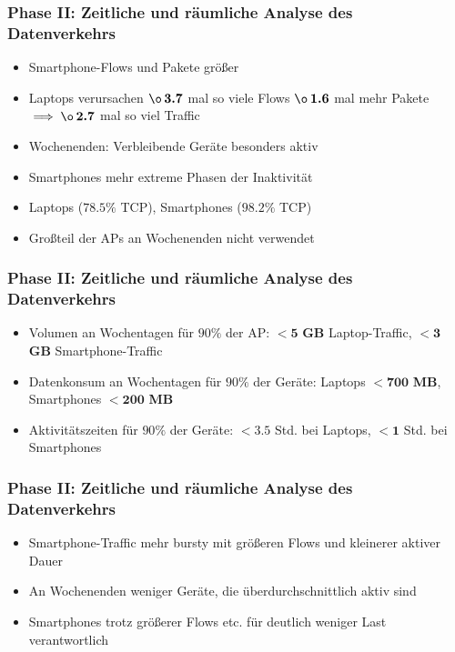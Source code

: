 \documentclass{beamer}
\begin{document}
\begin{frame}
  \frametitle{Phase II: Zeitliche und räumliche Analyse des Datenverkehrs}
  \begin{itemize}
    \item Smartphone-Flows und Pakete größer
    \item Laptops verursachen $\boldsymbol{\o \thinspace 3.7}$ mal so viele Flows\newline
    \phantom \quad\quad\quad\quad\quad\quad\quad\quad\thinspace\thinspace\thinspace\thinspace\thinspace $\boldsymbol{\o \thinspace 1.6}$ mal mehr Pakete\newline
    \phantom \quad\quad\quad\quad\quad\quad\thinspace\thinspace $\implies \boldsymbol{\o \thinspace 2.7}$ mal so viel Traffic
    \item Wochenenden: Verbleibende Geräte besonders aktiv
    \item Smartphones mehr extreme Phasen der Inaktivität
    \item Laptops ($\boldsymbol{78.5 \%}$ TCP), Smartphones ($\boldsymbol{98.2 \%}$ TCP)
    \item Großteil der APs an Wochenenden nicht verwendet
  \end{itemize}
  
\end{frame}

\begin{frame}
  \frametitle{Phase II: Zeitliche und räumliche Analyse des Datenverkehrs}
  \begin{itemize}
    
    \item Volumen an Wochentagen für $90 \%$ der AP:\newline
    $\boldsymbol{<5}$ \textbf{\textsc{GB}} Laptop-Traffic, $\boldsymbol{<3}$ \textbf{\textsc{GB}} Smartphone-Traffic\newline
    \item Datenkonsum an Wochentagen für $90 \%$ der Geräte:\newline
    Laptops $\boldsymbol{<700}$ \textbf{\textsc{MB}}, Smartphones $\boldsymbol{<200}$ \textbf{\textsc{MB}}\newline
    \item Aktivitätszeiten für $90 \%$ der Geräte:\newline
    $\boldsymbol{<3.5}$ Std. bei Laptops, $\boldsymbol{<1}$ Std. bei Smartphones
  \end{itemize}
\end{frame}

\begin{frame}
  \frametitle{Phase II: Zeitliche und räumliche Analyse des Datenverkehrs}
  \begin{itemize}
    \item Smartphone-Traffic mehr bursty mit größeren Flows und kleinerer aktiver Dauer
    \item An Wochenenden weniger Geräte, die überdurchschnittlich aktiv sind
    \item Smartphones trotz größerer Flows etc. für deutlich weniger Last verantwortlich
  \end{itemize}
\end{frame}
\end{document}
